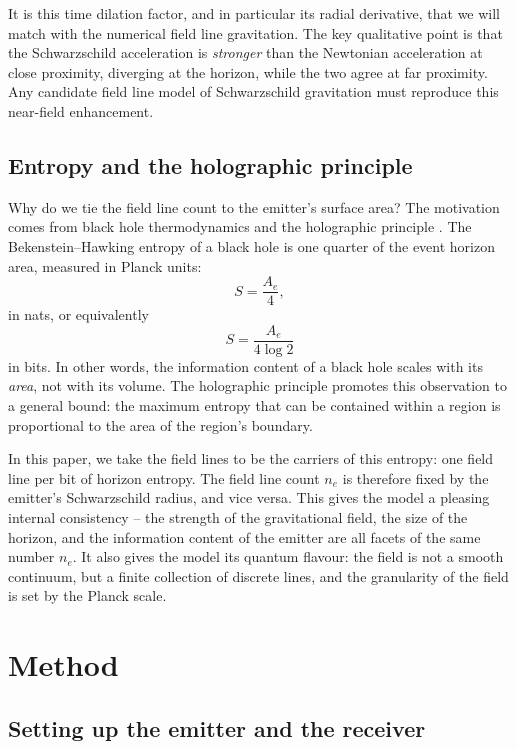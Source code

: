 \documentclass[10pt]{article}
\begin{document}
It is this time dilation factor, and in particular its radial derivative, that we will match with the numerical field line gravitation.
The key qualitative point is that the Schwarzschild acceleration is {\em stronger} than the Newtonian acceleration at close proximity, diverging at the horizon, while the two agree at far proximity.
Any candidate field line model of Schwarzschild gravitation must reproduce this near-field enhancement.

\subsection{Entropy and the holographic principle}

Why do we tie the field line count to the emitter's surface area?
The motivation comes from black hole thermodynamics and the holographic principle \cite{hooft}.
The Bekenstein--Hawking entropy of a black hole is one quarter of the event horizon area, measured in Planck units:
\begin{equation}
S = \frac{A_e}{4},
\end{equation}
in nats, or equivalently
\begin{equation}
S = \frac{A_e}{4 \log 2}
\end{equation}
in bits.
In other words, the information content of a black hole scales with its {\em area}, not with its volume.
The holographic principle promotes this observation to a general bound: the maximum entropy that can be contained within a region is proportional to the area of the region's boundary.

In this paper, we take the field lines to be the carriers of this entropy: one field line per bit of horizon entropy.
The field line count $n_e$ is therefore fixed by the emitter's Schwarzschild radius, and vice versa.
This gives the model a pleasing internal consistency -- the strength of the gravitational field, the size of the horizon, and the information content of the emitter are all facets of the same number $n_e$.
It also gives the model its quantum flavour: the field is not a smooth continuum, but a finite collection of discrete lines, and the granularity of the field is set by the Planck scale.




\section{Method}
\label{sec:method}

\subsection{Setting up the emitter and the receiver}
\end{document}
